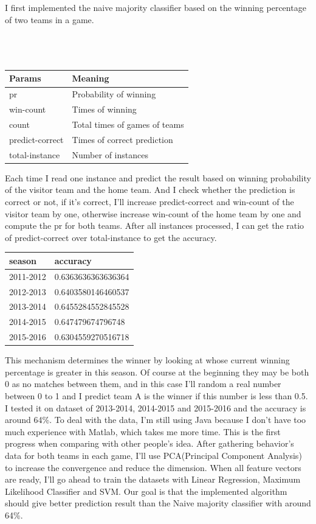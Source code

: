 \documentclass{article}
\begin{document}
 I first implemented the naive majority classifier based on the winning percentage of two teams in a game. 
\\
\\
\\
\\
\begin{center}
\begin{tabular}{|l|l|}
\hline
Params    & Meaning           \\ \hline
pr & Probability of winning \\ \hline
win-count & Times of winning \\ \hline
count & Total times of games of teams \\ \hline
predict-correct & Times of correct prediction  \\ \hline
total-instance & Number of instances \\ \hline
\end{tabular}
\end{center}
Each time I read one instance and predict the result based on winning probability of the visitor team and the home team. And I check whether the prediction is correct or not, if it's correct, I'll increase predict-correct and win-count of the visitor team by one, otherwise increase win-count of the home team by one and compute the pr for both teams. After all instances processed, I can get the ratio of predict-correct over total-instance to get the accuracy.
\\
\begin{center}
\begin{tabular}{|l|l|}
\hline
season    & accuracy           \\ \hline
2011-2012 & 0.6363636363636364 \\ \hline
2012-2013 & 0.6403580146460537 \\ \hline
2013-2014 & 0.6455284552845528 \\ \hline
2014-2015 & 0.647479674796748  \\ \hline
2015-2016 & 0.6304559270516718 \\ \hline
\end{tabular}
\end{center}
 This mechanism determines the winner by looking at whose current winning percentage is greater in this season. Of course at the beginning they may be both 0 as no matches between them, and in this case I'll random a real number between 0 to 1 and I predict team A is the winner if this number is less than 0.5. I tested it on dataset of 2013-2014, 2014-2015 and 2015-2016 and the accuracy is around 64\%. To deal with the data, I'm still using Java because I don't have too much experience with Matlab, which takes me more time. This is the first progress when comparing with other people's idea. After gathering behavior's data for both teams in each game, I'll use PCA(Principal  Component Analysis) to increase the convergence and reduce the dimension. When all feature vectors are ready, I'll go ahead to train the datasets with Linear Regression, Maximum Likelihood Classifier and SVM. Our goal is that the implemented algorithm should give better prediction result than the Naive majority classifier with around 64\%.
 
\end{document}
